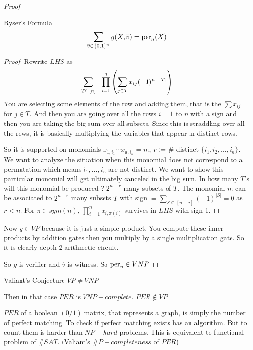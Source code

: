 {\begin{proof}
	\begin{claim}{Ryser's Formula \cite{ryser1963combinatorial}}{}
		$$\sum\limits_{\overline{v}\in \{0,1\}^n} g(X,\overline{v})=\text{per}_n(X)$$
	\end{claim}
\begin{proof}
	Rewrite $LHS$ as $$\sum_{T\subseteq [n]}\ \  \prod_{i=1}^n\lt(  \sum_{j\in T }x_{ij}(-1)^{n-|T|} \rt)$$
	You are selecting some elements of the row and adding them, that is the $\sum x_{ij}$ for $j\in T$. And then you are going over all the rows $i=1$ to $n$ with a sign and then you are taking the big sum over all subsets. Since this is straddling over all the rows, it is basically multiplying the variables that appear in distinct rows.
	
	So it is supported on monomials $x_{1,i_1}\cdots x_{n,i_n}=m$, $r\coloneqq $ \# distinct $\{i_1,i_2,\dots, i_n\}$. We want to analyze the situation when this monomial does not correspond to a permutation which means $i_1,\dots,i_n$ are not distinct. We want to show this particular monomial will get ultimately canceled in the big sum. In how many $T$'s will this monomial  be produced ? $2^{n-r}$ many subsets of $T$. The monomial $m$ can be associated to $2^{n-r}$ many subsets $T$ with sign $=\sum\limits_{S\subseteq [n-r]} (-1)^{|S|}=0$ as $r<n$. For $\pi\in sym(n)$, $\prod\limits_{i=1}^n x_{i,\pi(i)}$ survives in $LHS$ with sign 1.
\end{proof}

Now $g\in VP$ because it is just a simple product. You compute these inner products by addition gates then you multiply by a single multiplication gate. So it is clearly depth 2 arithmetic circuit.

So $g$ is verifier and $\overline{v}$ is witness. So $\text{per}_n\in VNP$
\end{proof}

\begin{conjecture}{Valiant's Conjecture}{}
	$VP\neq VNP$
\end{conjecture}
Then in that case $PER$ is $VNP-complete.$ $PER\notin VP$
\parinn

$PER$ of a boolean $(0/1)$ matrix, that represents a graph, is simply the number of perfect matching. To check if perfect matching exists has an algorithm. But to count them is harder than $NP-hard$ problems. This is equivalent to functional problem of $\#SAT$. (Valiant's $\#P-completeness$ of $PER$)

 
}
